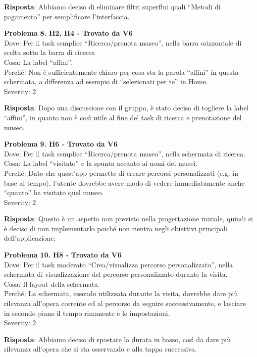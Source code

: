 \documentclass{article}
\begin{document}
\noindent \textbf{Risposta}: Abbiamo deciso di eliminare filtri superflui quali “Metodi di pagamento” per semplificare l’interfaccia.

\noindent \textbf{Problema 8. H2, H4 - Trovato da V6} \\
Dove: Per il task semplice “Ricerca/prenota museo”, nella barra orizzontale di scelta sotto la barra di ricerca \\
Cosa: La label “affini”. \\
Perché: Non è sufficientemente chiaro per cosa sta la parola “affini” in questa schermata, a differenza ad esempio di “selezionati per te” in Home. \\
Severity: 2

\noindent \textbf{Risposta}: Dopo una discussione con il gruppo, è stato deciso di togliere la label “affini”, in quanto non è così utile al fine del task di ricerca e prenotazione del museo.

\noindent \textbf{Problema 9. H6 - Trovato da V6} \\
Dove: Per il task semplice “Ricerca/prenota museo”, nella schermata di ricerca. \\
Cosa: La label “visitato” e la spunta accanto ai nomi dei musei. \\
Perché: Dato che quest’app permette di creare percorsi personalizzati (e.g. in base al tempo), l’utente dovrebbe avere modo di vedere immediatamente anche “quanto” ha visitato quel museo. \\
Severity: 2

\noindent \textbf{Risposta}: Questo è un aspetto non previsto nella progettazione iniziale, quindi si è deciso di non implementarlo poiché non rientra negli obiettivi principali dell’applicazione.

\noindent \textbf{Problema 10. H8 - Trovato da V6} \\
Dove: Per il task moderato “Crea/visualizza percorso personalizzato”, nella schermata di visualizzazione del percorso personalizzato durante la visita. \\
Cosa: Il layout della schermata. \\
Perché: La schermata, essendo utilizzata durante la visita, dovrebbe dare più rilevanza all’opera corrente ed al percorso da seguire successivamente, e lasciare in secondo piano il tempo rimanente e le impostazioni. \\
Severity: 2

\noindent \textbf{Risposta}: Abbiamo deciso di spostare la durata in basso, così da dare più rilevanza all’opera che si sta osservando e alla tappa successiva.
\end{document}
